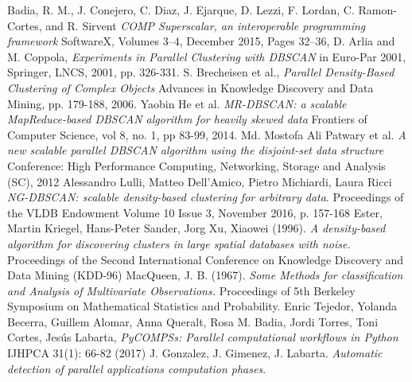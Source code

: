 \documentclass[10pt,journal,compsoc]{IEEEtran}
\begin{document}
\begin{thebibliography}{1}
Badia, R. M., J. Conejero, C. Diaz, J. Ejarque, D. Lezzi, F. Lordan, C. Ramon-Cortes, and R. Sirvent \textit{COMP Superscalar, an interoperable programming framework} SoftwareX, Volumes 3–4, December 2015, Pages 32–36, 
D. Arlia and M. Coppola, \textit{Experiments in Parallel Clustering
with DBSCAN} in Euro-Par 2001, Springer, LNCS, 2001, pp.
326-331.
 S. Brecheisen et al., \textit{Parallel Density-Based Clustering of Complex Objects} Advances in Knowledge Discovery and
Data Mining, pp. 179-188, 2006.
Yaobin He et al. \textit{MR-DBSCAN: a scalable MapReduce-based DBSCAN algorithm for heavily skewed data} Frontiers of Computer Science, vol 8, no. 1, pp 83-99, 2014.
Md. Mostofa Ali Patwary et al. \textit{A new scalable parallel DBSCAN algorithm using the disjoint-set data structure} Conference: High Performance Computing, Networking, Storage and Analysis (SC), 2012 
Alessandro Lulli, Matteo Dell'Amico, Pietro Michiardi, Laura Ricci \textit{NG-DBSCAN: scalable density-based clustering for arbitrary data}. Proceedings of the VLDB Endowment Volume 10 Issue 3, November 2016, p. 157-168 
Ester, Martin Kriegel, Hans-Peter Sander, Jorg Xu, Xiaowei (1996). \textit{A density-based algorithm for discovering clusters in large spatial databases with noise.} Proceedings of the Second International Conference on Knowledge Discovery and Data Mining (KDD-96)
MacQueen, J. B. (1967). \textit{Some Methods for classification and Analysis of Multivariate Observations.} Proceedings of 5th Berkeley Symposium on Mathematical Statistics and Probability.
Enric Tejedor, Yolanda Becerra, Guillem Alomar, Anna Queralt, Rosa M. Badia, Jordi Torres, Toni Cortes, Jesús Labarta, \textit{PyCOMPSs: Parallel computational workflows in Python}  IJHPCA 31(1): 66-82 (2017)
J. Gonzalez, J. Gimenez, J. Labarta. \textit{Automatic detection of parallel applications computation phases}.
\end{thebibliography}
\end{document}
